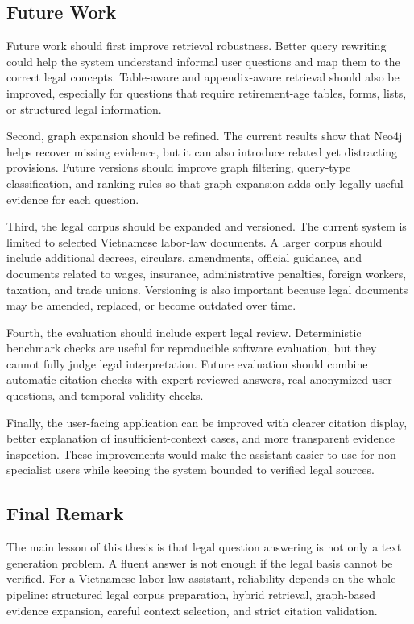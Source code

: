 \subsection{Future Work}

Future work should first improve retrieval robustness. Better query rewriting could help the system understand informal user questions and map them to the correct legal concepts. Table-aware and appendix-aware retrieval should also be improved, especially for questions that require retirement-age tables, forms, lists, or structured legal information.

Second, graph expansion should be refined. The current results show that Neo4j helps recover missing evidence, but it can also introduce related yet distracting provisions. Future versions should improve graph filtering, query-type classification, and ranking rules so that graph expansion adds only legally useful evidence for each question.

Third, the legal corpus should be expanded and versioned. The current system is limited to selected Vietnamese labor-law documents. A larger corpus should include additional decrees, circulars, amendments, official guidance, and documents related to wages, insurance, administrative penalties, foreign workers, taxation, and trade unions. Versioning is also important because legal documents may be amended, replaced, or become outdated over time.

Fourth, the evaluation should include expert legal review. Deterministic benchmark checks are useful for reproducible software evaluation, but they cannot fully judge legal interpretation. Future evaluation should combine automatic citation checks with expert-reviewed answers, real anonymized user questions, and temporal-validity checks.

Finally, the user-facing application can be improved with clearer citation display, better explanation of insufficient-context cases, and more transparent evidence inspection. These improvements would make the assistant easier to use for non-specialist users while keeping the system bounded to verified legal sources.

\subsection{Final Remark}

\enlargethispage{2\baselineskip}
The main lesson of this thesis is that legal question answering is not only a text generation problem. A fluent answer is not enough if the legal basis cannot be verified. For a Vietnamese labor-law assistant, reliability depends on the whole pipeline: structured legal corpus preparation, hybrid retrieval, graph-based evidence expansion, careful context selection, and strict citation validation.
